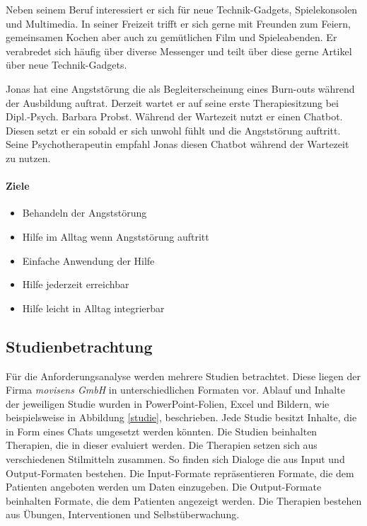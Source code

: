 Neben seinem Beruf interessiert er sich für neue Technik-Gadgets, Spielekonsolen und Multimedia. In seiner Freizeit trifft er sich gerne mit Freunden zum Feiern, gemeinsamen Kochen aber auch zu gemütlichen Film und Spieleabenden. Er verabredet sich häufig über diverse Messenger und teilt über diese gerne Artikel über neue Technik-Gadgets.

Jonas hat eine Angststörung die als Begleiterscheinung eines Burn-outs während der Ausbildung auftrat.  Derzeit wartet er auf seine erste Therapiesitzung bei Dipl.-Psych. Barbara Probst. Während der Wartezeit nutzt er einen Chatbot. Diesen setzt er ein sobald er sich unwohl fühlt und die Angststörung auftritt. Seine Psychotherapeutin empfahl Jonas diesen Chatbot während der Wartezeit zu nutzen.

\paragraph{Ziele}
\begin{itemize}
\item Behandeln der Angststörung
\item Hilfe im Alltag wenn Angststörung auftritt
\item Einfache Anwendung der Hilfe
\item Hilfe jederzeit erreichbar
\item Hilfe leicht in Alltag integrierbar
\end{itemize}


\subsection{Studienbetrachtung}
Für die Anforderungsanalyse werden mehrere Studien betrachtet. Diese liegen der Firma \emph{movisens GmbH} in unterschiedlichen Formaten vor. Ablauf und Inhalte der jeweiligen Studie wurden in PowerPoint-Folien, Excel und Bildern, wie beispielsweise in Abbildung \ref{studie}, beschrieben. Jede Studie besitzt Inhalte, die in Form eines Chats umgesetzt werden könnten. Die Studien beinhalten Therapien, die in dieser evaluiert werden. Die Therapien setzen sich aus verschiedenen Stilmitteln zusammen. So finden sich Dialoge die aus Input und Output-Formaten bestehen. Die Input-Formate repräsentieren Formate, die dem Patienten angeboten werden um Daten einzugeben. Die Output-Formate beinhalten Formate, die dem Patienten angezeigt werden. Die Therapien bestehen aus Übungen, Interventionen und Selbstüberwachung.

